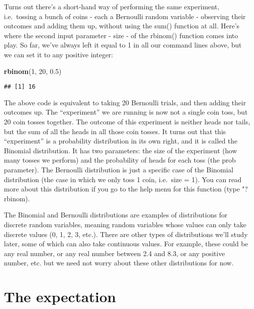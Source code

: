 \documentclass[
]{book}
\newenvironment{Shaded}{\begin{snugshade}}{\end{snugshade}}
\newcommand{\DecValTok}[1]{\textcolor[rgb]{0.00,0.00,0.81}{#1}}
\newcommand{\FloatTok}[1]{\textcolor[rgb]{0.00,0.00,0.81}{#1}}
\newcommand{\KeywordTok}[1]{\textcolor[rgb]{0.13,0.29,0.53}{\textbf{#1}}}
\newcommand{\NormalTok}[1]{#1}
\begin{document}
Turns out there's a short-hand way of performing the same experiment, i.e.~tossing a bunch of coins - each a Bernoulli random variable - observing their outcomes and adding them up, without using the sum() function at all. Here's where the second input parameter - size - of the rbinom() function comes into play. So far, we've always left it equal to 1 in all our command lines above, but we can set it to any positive integer:

\begin{Shaded}
\begin{Highlighting}[]
\KeywordTok{rbinom}\NormalTok{(}\DecValTok{1}\NormalTok{, }\DecValTok{20}\NormalTok{, }\FloatTok{0.5}\NormalTok{)}
\end{Highlighting}
\end{Shaded}

\begin{verbatim}
## [1] 16
\end{verbatim}

The above code is equivalent to taking 20 Bernoulli trials, and then adding their outcomes up. The ``experiment'' we are running is now not a single coin toss, but 20 coin tosses together. The outcome of this experiment is neither heads nor tails, but the sum of all the heads in all those coin tosses. It turns out that this ``experiment'' is a probability distribution in its own right, and it is called the Binomial distribution. It has two parameters: the size of the experiment (how many tosses we perform) and the probability of heads for each toss (the prob parameter). The Bernoulli distribution is just a specific case of the Binomial distribution (the case in which we only toss 1 coin, i.e.~size = 1). You can read more about this distribution if you go to the help menu for this function (type "?rbinom).

The Binomial and Bernoulli distributions are examples of distributions for discrete random variables, meaning random variables whose values can only take discrete values (0, 1, 2, 3, etc.). There are other types of distributions we'll study later, some of which can also take continuous values. For example, these could be any real number, or any real number between 2.4 and 8.3, or any positive number, etc. but we need not worry about these other distributions for now.

\hypertarget{the-expectation}{%
\section{The expectation}\label{the-expectation}}
\end{document}
